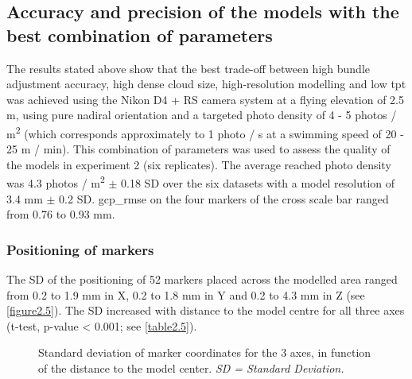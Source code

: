 \subsection{Accuracy and precision of the models with the best combination of parameters}\label{chapitre2_3.2}
The results stated above show that the best trade-off between high bundle adjustment accuracy, high dense cloud size, high-resolution modelling and low \acrshort{tpt} was achieved using the Nikon D4 + RS camera system at a flying elevation of 2.5 m, using pure nadiral orientation and a targeted photo density of 4 - 5 photos / m\textsuperscript{2} (which corresponds approximately to 1 photo / s at a swimming speed of 20 - 25 m / min). This combination of parameters was used to assess the quality of the models in experiment 2 (six replicates). The average reached photo density was 4.3 photos / m\textsuperscript{2} $\pm$ 0.18 SD over the six datasets with a model resolution of 3.4 mm $\pm$ 0.2 SD. \acrshort{gcp_rmse} on the four markers of the cross scale bar ranged from 0.76 to 0.93 mm.

\subsubsection{Positioning of markers}\label{chapitre2_3.2.1}
The SD of the positioning of 52 markers placed across the modelled area ranged from 0.2 to 1.9 mm in X, 0.2 to 1.8 mm in Y and 0.2 to 4.3 mm in Z (see \autoref{figure2.5}). The SD increased with distance to the model centre for all three axes (t-test, p-value < 0.001; see \autoref{table2.5}).

\begin{figure}[htbp]
	\caption[Standard deviation of marker coordinates for the 3 axes]{Standard deviation of marker coordinates for the 3 axes, in function of the distance to the model center. \textit{SD = Standard Deviation.}}
	\label{figure2.5}
\end{figure}



